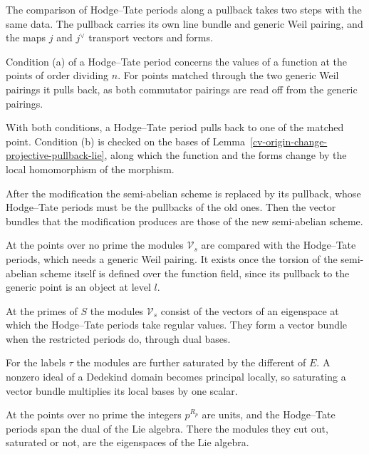 The comparison of Hodge--Tate periods along a pullback takes two steps with the same data. The pullback carries its own
line bundle and generic Weil pairing, and the maps $j$ and $j^\vee$ transport vectors and forms.

Condition (a) of a Hodge--Tate period concerns the values of a function at the points of order dividing $n$. For points
matched through the two generic Weil pairings it pulls back, as both commutator pairings are read off from the generic
pairings.

With both conditions, a Hodge--Tate period pulls back to one of the matched point. Condition (b) is checked on the bases
of Lemma~\ref{cv-origin-change-projective-pullback-lie}, along which the function and the forms change by the local
homomorphism of the morphism.

After the modification the semi-abelian scheme is replaced by its pullback, whose Hodge--Tate periods must be the
pullbacks of the old ones. Then the vector bundles that the modification produces are those of the new semi-abelian
scheme.

At the points over no prime the modules $\mathcal V_s$ are compared with the Hodge--Tate periods, which needs a generic
Weil pairing. It exists once the torsion of the semi-abelian scheme itself is defined over the function field, since its
pullback to the generic point is an object at level $l$.

At the primes of $S$ the modules $\mathcal V_s$ consist of the vectors of an eigenspace at which the Hodge--Tate periods
take regular values. They form a vector bundle when the restricted periods do, through dual bases.

For the labels $\tau$ the modules are further saturated by the different of $E$. A nonzero ideal of a Dedekind domain
becomes principal locally, so saturating a vector bundle multiplies its local bases by one scalar.

At the points over no prime the integers $p^{R_p}$ are units, and the Hodge--Tate periods span the dual of the Lie algebra.
There the modules they cut out, saturated or not, are the eigenspaces of the Lie algebra.

